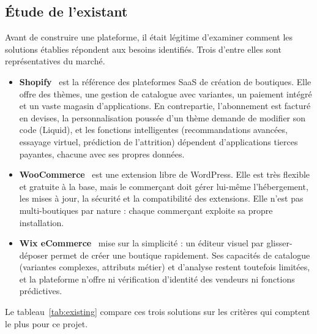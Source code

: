 \subsection{Étude de l'existant}
Avant de construire une plateforme, il était légitime d'examiner comment les solutions établies répondent aux besoins identifiés. Trois d'entre elles sont représentatives du marché.
\begin{itemize}
\item \textbf{Shopify}~\cite{Shopify2026} est la référence des plateformes SaaS de création de boutiques. Elle offre des thèmes, une gestion de catalogue avec variantes, un paiement intégré et un vaste magasin d'applications. En contrepartie, l'abonnement est facturé en devises, la personnalisation poussée d'un thème demande de modifier son code (Liquid), et les fonctions intelligentes (recommandations avancées, essayage virtuel, prédiction de l'attrition) dépendent d'applications tierces payantes, chacune avec ses propres données.

\item \textbf{WooCommerce}~\cite{WooCommerce2026} est une extension libre de WordPress. Elle est très flexible et gratuite à la base, mais le commerçant doit gérer lui-même l'hébergement, les mises à jour, la sécurité et la compatibilité des extensions. Elle n'est pas multi-boutiques par nature : chaque commerçant exploite sa propre installation.

\item \textbf{Wix eCommerce}~\cite{Wix2026} mise sur la simplicité : un éditeur visuel par glisser-déposer permet de créer une boutique rapidement. Ses capacités de catalogue (variantes complexes, attributs métier) et d'analyse restent toutefois limitées, et la plateforme n'offre ni vérification d'identité des vendeurs ni fonctions prédictives.
\end{itemize}
\Needspace{15cm}
Le tableau~\ref{tab:existing} compare ces trois solutions sur les critères qui comptent le plus pour ce projet.
